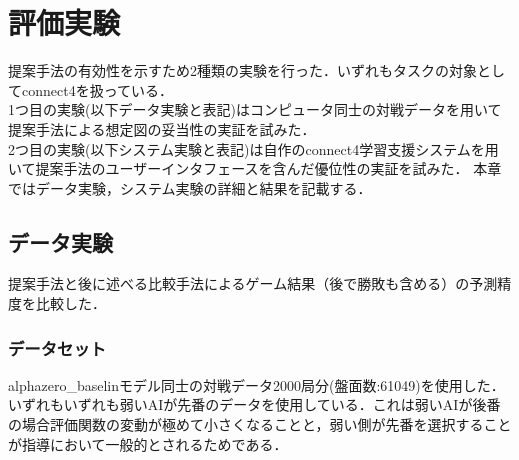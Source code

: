 \chapter{評価実験}
提案手法の有効性を示すため2種類の実験を行った．いずれもタスクの対象としてconnect4を扱っている．\\
1つ目の実験(以下データ実験と表記)はコンピュータ同士の対戦データを用いて提案手法による想定図の妥当性の実証を試みた．\\
2つ目の実験(以下システム実験と表記)は自作のconnect4学習支援システムを用いて提案手法のユーザーインタフェースを含んだ優位性の実証を試みた．
本章ではデータ実験，システム実験の詳細と結果を記載する．



\section{データ実験}
\label{chap:evaluation}
提案手法と後に述べる比較手法によるゲーム結果（後で勝敗も含める）の予測精度を比較した．
\subsection{データセット}
alphazero\_baselinモデル同士の対戦データ2000局分(盤面数:61049)を使用した．いずれもいずれも弱いAIが先番のデータを使用している．これは弱いAIが後番の場合評価関数の変動が極めて小さくなることと，弱い側が先番を選択することが指導において一般的とされるためである．



